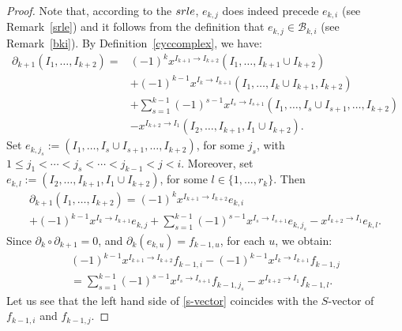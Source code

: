 \documentclass[10pt]{amsart}
\newcommand{\mcb}{\mbox{$\mathcal{B}$}}
\newcommand{\dif}{\mbox{$\partial$}}
\newcommand{\srle}{\mbox{${\rm srle}$}}
\theoremstyle{definition}
\theoremstyle{remark}
\begin{document}
\begin{proof}
Note that, according to the $\srle$, $e_{k,j}$ does indeed precede
$e_{k,i}$ (see Remark~\ref{srle}) and it follows from the definition
that $e_{k,j}\in\mcb_{k,i}$ (see Remark~\ref{bki}). By
Definition~\ref{cyccomplex}, we have:
\begin{align*}
\dif_{k+1}(I_1,\ldots,I_{k+2})=& (-1)^{k}x^{I_{k+1}\to
    I_{k+2}}(I_1,\ldots ,I_{k+1}\cup I_{k+2})\\
&+ (-1)^{k-1}x^{I_{k}\to I_{k+1}}(I_1,\ldots ,I_{k}\cup
  I_{k+1},I_{k+2})\\
&+\sum_{s=1}^{k-1}(-1)^{s-1}x^{I_s\to
    I_{s+1}}(I_1,\ldots ,I_s\cup I_{s+1},\ldots
  ,I_{k+2})\\
&-x^{I_{k+2}\to I_1}(I_2,\ldots,I_{k+1},I_1\cup I_{k+2}).
\end{align*}
Set $e_{k,j_s}:=(I_1,\ldots ,I_s\cup I_{s+1},\ldots ,I_{k+2})$, for
some $j_s$, with $1\leq j_1<\cdots< j_s<\cdots<j_{k-1}<j<i$.
Moreover, set $e_{k,l}:=(I_2,\ldots,I_{k+1},I_1\cup I_{k+2})$, for
some $l\in \{1,\ldots ,r_{k}\}$. Then
\begin{multline}\label{difbasisele}
 \dif_{k+1}(I_1,\ldots,I_{k+2})= (-1)^{k}x^{I_{k+1}\to
  I_{k+2}}e_{k,i}\\ 
+(-1)^{k-1}x^{I_{k}\to   I_{k+1}}e_{k,j}+ \sum_{s=1}^{k-1}(-1)^{s-1}x^{I_s\to
  I_{s+1}}e_{k,j_s}-x^{I_{k+2}\to I_1}e_{k,l}.
\end{multline}
Since $\dif_{k}\circ\dif_{k+1}=0$, and $\dif_{k}(e_{k,u})=f_{k-1,u}$,
for each $u$, we obtain:
\begin{multline}\label{s-vector}
 (-1)^{k-1}x^{I_{k+1}\to I_{k+2}}f_{k-1,i}-(-1)^{k-1}x^{I_{k}\to
    I_{k+1}}f_{k-1,j}\\
= \sum_{s=1}^{k-1}(-1)^{s-1}x^{I_s\to
    I_{s+1}}f_{k-1,j_s}-x^{I_{k+2}\to I_1}f_{k-1,l}.
\end{multline}
Let us see that the left hand side of \eqref{s-vector} coincides
with the $S$-vector of $f_{k-1,i}$ and $f_{k-1,j}$. 


\end{proof}
\end{document}
